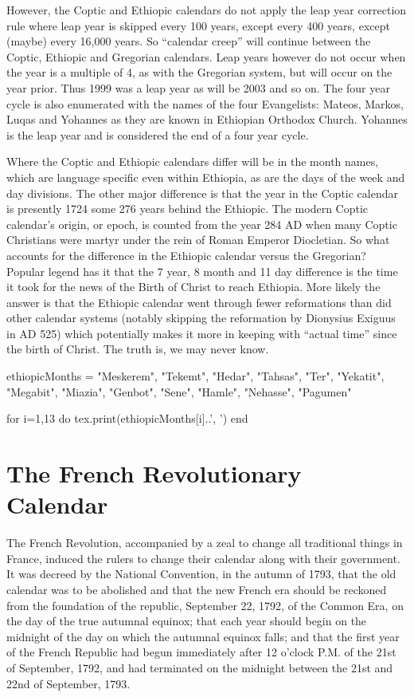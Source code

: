 However, the Coptic and Ethiopic calendars do not apply the leap year correction rule where leap year is skipped every 100 years, except every 400 years, except (maybe) every 16,000 years. So “calendar creep” will continue between the Coptic, Ethiopic and Gregorian calendars. Leap years however do not occur when the year is a multiple of 4, as with the Gregorian system, but will occur on the year prior. Thus 1999 was a leap year as will be 2003 and so on. The four year cycle is also enumerated with the names of the four Evangelists: Mateos, Markos, Luqas and Yohannes as they are known in Ethiopian Orthodox Church. Yohannes is the leap year and is considered the end of a four year cycle.

Where the Coptic and Ethiopic calendars differ will be in the month names, which are language specific even within Ethiopia, as are the days of the week and day divisions. The other major difference is that the year in the Coptic calendar is presently 1724 some 276 years behind the Ethiopic. The modern Coptic calendar’s origin, or epoch, is counted from the year 284 AD when many Coptic Christians were martyr under the rein of Roman Emperor Diocletian. So what accounts for the difference in the Ethiopic calendar versus the Gregorian? Popular legend has it that the 7 year, 8 month and 11 day difference is the time it took for the news of the Birth of Christ to reach Ethiopia. More likely the answer is that the Ethiopic calendar went through fewer reformations than did other calendar systems (notably skipping the reformation by Dionysius Exiguus in AD 525) which potentially makes it more in keeping with “actual time” since the birth of Christ. The truth is, we may never know.

\begin{luacode}
ethiopicMonths = {
"Meskerem",
"Tekemt",
"Hedar",
"Tahsas",
"Ter",
"Yekatit",
"Megabit",
"Miazia",
"Genbot",
"Sene",
"Hamle",
"Nehasse",
"Pagumen"
}

for i=1,13 do 
   tex.print(ethiopicMonths[i]..', ')
end
\end{luacode}


\section{The French Revolutionary Calendar}

The French Revolution, accompanied by a zeal to change all traditional things in France, induced the rulers to change their calendar along with their government.  It was decreed by the National Convention, in the autumn of 1793, that the old calendar was to be abolished and that the new French era should be reckoned from the foundation of the republic, September 22, 1792, of the Common Era, on the day of the true autumnal equinox; that each year should begin on the midnight of the day on which the autumnal equinox falls; and that the first year of the French Republic had begun immediately after 12 o’clock P.M. of the 21st of September, 1792, and had terminated on the midnight between the 21st and 22nd of September, 1793.


